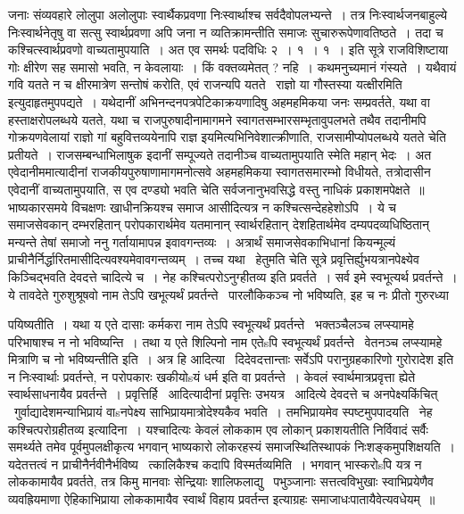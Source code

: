\documentclass[11pt, openany]{book}
\begin{document}
जनाः संव्यवहारे लोलुपा अलोलुपाः स्वार्थैकप्रवणा निःस्वार्थाश्च सर्वदैवोपलभ्यन्ते~। तत्र निःस्वार्थजनबाहुल्ये निःस्वार्थनेतृषु वा सत्सु स्वार्थप्रवणा अपि जना न व्यतिक्रामन्तीति समाजः सुचारुरूपेणावतिष्ठते~। तदा च कश्चित्स्वार्थप्रवणो वाच्यतामुपयाति~। अत एव समर्थः पदविधिः २~। १~। १~। इति सूत्रे {\qt राजविशिष्टाया गोः क्षीरेण सह समासो भवति, न केवलायाः~। किं वक्तव्यमेतत् ? नहि~। कथमनुच्यमानं गंस्यते~। यथैवायं गवि यतते न च क्षीरमात्रेण सन्तोषं करोति, एवं राजन्यपि यतते \textendash\ राज्ञो या गौस्तस्या यत्क्षीरमिति} इत्युदाहृतमुपपद्यते~। यथेदानीं अभिनन्दनपत्रपेटिकाक्रयणादिषु अहमहमिकया जनः सम्प्रवर्तते, यथा वा हस्ताक्षरोपलब्धये यतते, यथा च राजपुरुषादीनामागमने स्वागतसम्भारसम्भृतावुपलभते तथैव तदानीमपि गोक्रयणवेलायां राज्ञो गां बहुवित्तव्ययेनापि राज्ञ इयमित्यभिनिवेशात्क्रीणाति, राजसामीप्योपलब्धये यतते चेति प्रतीयते~। राजसम्बन्धाभिलाषुक इदानीं सम्पूज्यते तदानीञ्च वाच्यतामुपयाति स्मेति महान् भेदः~। अत एवेदानीममात्यादीनां राजकीयपुरुषाणामागमनोत्सवे अहमहमिकया स्वागतसमारम्भो विधीयते, तत्रोदासीन एवेदानीं वाच्यतामुपयाति, स एव दण्ड्यो भवति चेति सर्वजनानुभवसिद्धे वस्तु नाधिकं प्रकाशमपेक्षते~॥\\

भाष्यकारसमये विचक्षणः खाधीनक्रियश्च समाज आसीदित्यत्र न कश्चित्सन्देहहेशोऽपि~। ये च समाजसेवकान् दम्भरहितान् परोपकारार्थमेव यतमानान् स्वार्थरहितान् देशहितार्थमेव दम्यपदव्यधिष्ठितान् मन्यन्ते तेषां समाजो ननु गर्तायामापन्न इवावगन्तव्यः~। अत्रार्थं समाजसेवकाभिधानां कियन्मूल्यं प्राचीनैर्निर्द्धारितमासीदित्यवश्यमेवावगन्तव्यम्~। तच्च यथा \textendash\ हेतुमति चेति सूत्रे प्रवृत्तिर्ह्युभयत्रानपेक्ष्येव किञ्चिद्भवति देवदत्ते चादित्ये च~। नेह कश्चित्परोऽनुग्हीतव्य इति प्रवर्तते~। सर्व इमे स्वभूत्यर्थ प्रवर्तन्ते~। ये तावदेते गुरुशुश्रूषवो नाम तेऽपि खभूत्यर्थं प्रवर्तन्ते \textendash\ पारलौकिकञ्च नो भविष्यति, इह च नः प्रीतो गुरुरध्या

\newpage

\noindent
पयिष्यतीति~। यथा य एते दासाः कर्मकरा नाम तेऽपि स्वभूत्यर्थं प्रवर्तन्ते \textendash\ भक्तञ्चैलञ्च लप्स्यामहे परिभाषाश्च न नो भविष्यन्ति~। तथा य एते शिल्पिनो नाम एतेsपि स्वभूत्यर्थं प्रवर्तन्ते \textendash\ वेतनञ्च लप्स्यामहे मित्राणि च नो भविष्यन्तीति इति~। अत्र हि आदित्या \textendash\ दिदेवदत्तान्ताः सर्वेऽपि परानुग्रहकारिणो गुरोरादेश इति न निःस्वार्थाः प्रवर्तन्ते, न परोपकारः खकीयोsयं धर्म इति वा प्रवर्तन्ते~। केवलं स्वार्थमात्रप्रवृत्ता ह्येते स्वार्थसाधनायैव प्रवर्तन्ते~। प्रवृत्तिर्हि \textendash\ आदित्यादीनां प्रवृत्तिः उभयत्र \textendash\ आदित्ये देवदत्ते च अनपेक्ष्यकिंचित् \textendash\ गुर्वाद्यादेशमन्याभिप्रायं वाsनपेक्ष्य साभिप्रायमात्रोदेश्यकैव भवति~। तमभिप्रायमेव स्पष्टमुपपादयति \textendash\ नेह कश्चित्परोग्रहीतव्य इत्यादिना~। यश्चादित्यः केवलं लोककाम एव लोकान् प्रकाशयतीति निर्विवादं सर्वैः समर्थ्यते तमेव पूर्वमुपलक्षीकृत्य भगवान् भाष्यकारो लोकरहस्यं समाजस्थितिस्थापकं निःशङ्कमुपशिक्षयति~। यदेतत्तत्वं न प्राचीनैर्नवीनैर्भविष्य \textendash\ त्कालिकैश्च कदापि विस्मर्तव्यमिति~। भगवान् भास्करोsपि यत्र न लोककामायैव प्रवर्तते, तत्र किमु मानवाः सेन्द्रियाः शालिफलाद्यु \textendash\ पभुञ्जानाः सत्तत्वविभुखाः स्वाभिप्रयेणैव व्यवह्रियमाणा ऐहिकाभिप्राया लोककामायैव स्वार्थं विहाय प्रवर्तन्त इत्याग्रहः समाजाधःपातायैवेत्यवधेयम्~॥
\end{document}
